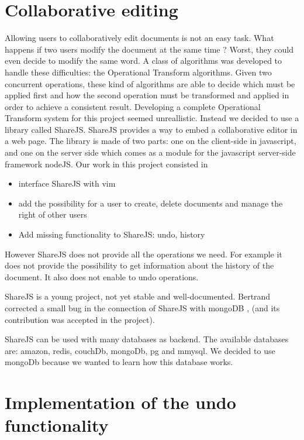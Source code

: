 \documentclass{llncs}
\begin{document}
\section{Collaborative editing}\label{sec:Collabo}

Allowing users to collaboratively edit documents is not an easy task.
What happens if two users modify the document at the same time ?
Worst, they could even decide to modify the same word. A class
of algorithms was developed to handle these difficulties:
the Operational Transform algorithms. Given two concurrent operations, these kind
of algorithms are able to decide which must be applied first and how the second
operation must be transformed and applied in order to achieve a consistent result.
Developing a complete Operational Transform system for this project seemed unreallistic.
Instead we decided to use a library called ShareJS. 
ShareJS provides a way to embed a collaborative editor in a web page.
The library is made of two parts: one on the client-side in javascript, 
and one on the server side which comes as a module for the javascript server-side framework
nodeJS.
Our work in this project consisted in
\begin{itemize}
\item interface ShareJS with vim
\item add the possibility for a user to create, delete documents and manage the right of other users
\item Add missing functionality to ShareJS: undo, history
\end{itemize}

However ShareJS does not provide all the operations we need.
For example it does not provide the possibility to get information about the history of the document.
It also does not enable to undo operations.

ShareJS is a young project, not yet stable and well-documented.
Bertrand corrected a small bug in the connection of ShareJS with mongoDB , (and its contribution was accepted in the project).

ShareJS can be used with many databases as backend. 
The available databases are: amazon, redis, couchDb, mongoDb, pg and mmysql.
We decided to use mongoDb because we wanted to learn how this database works.

\section{Implementation of the undo functionality}\label{sec:Others}
\end{document}
